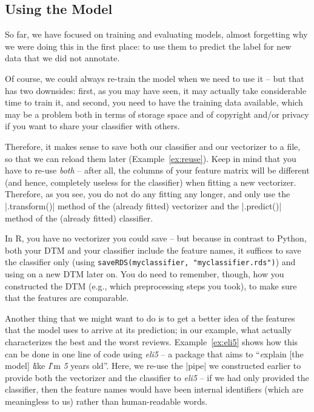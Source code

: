\subsection{Using the Model}

So far, we have focused on training and evaluating models, almost
forgetting why we were doing this in the first place: to use them to
predict the label for new data that we did not annotate.

Of course, we could always re-train the model when we need to use it
-- but that has two downsides: first, as you may have seen, it may
actually take considerable time to train it, and second, you need to
have the training data available, which may be a problem both in terms
of storage space and of copyright and/or privacy if you want to share
your classifier with others.

Therefore, it makes sense to save both our classifier and our
vectorizer to a file, so that we can reload them later
(Example~\ref{ex:reuse}). Keep in mind that you have to re-use \emph{both}
-- after all, the columns of your feature matrix will be different (and hence, completely useless for the classifier) when
fitting a new vectorizer. Therefore, as you see, you do not do any fitting any longer, and only use the |.transform()| method of the (already fitted) vectorizer and the |.predict()| method of the (already fitted) classifier.

In R, you have no vectorizer you could save -- but because in contrast to Python, both your DTM and your classifier include the feature names, it suffices to save the classifier only (using \verb+saveRDS(myclassifier, "myclassifier.rds")+) and using on a new DTM later on. You do need to remember, though, how you constructed the DTM (e.g., which preprocessing steps you took), to make sure that the features are comparable.




Another thing that we might want to do is to get a better idea of the
features that the model uses to arrive at its prediction; in our
example, what actually characterizes the best and the worst
reviews. Example~\ref{ex:eli5} shows how this can be done in one line of code
using \emph{eli5} -- a package that aims to ``\emph{e}xplain [the model]
\emph{l}ike \emph{I}'m \emph{5} years old''. Here, we re-use the
|pipe| we constructed earlier to provide both the vectorizer and the
classifier to  \emph{eli5} -- if we had only provided the
classifier, then the feature names would have been internal
identifiers (which are meaningless to us) rather than human-readable
words.

